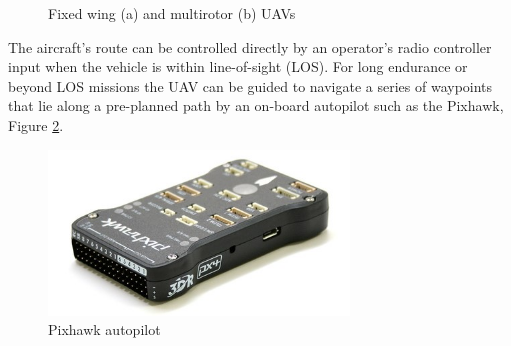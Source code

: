 \documentclass[numbered,pdftex]{ohio-etd}
\begin{document}
\begin{figure}[H]
	\begin{subfigmatrix}{2}%
		\centering	
		\hspace*{0mm}
	\end{subfigmatrix}
	\caption{Fixed wing (a) and multirotor (b) UAVs}
	\label{fig:fixedMultirotor}
\end{figure}

The aircraft's route can be controlled directly by an operator's radio controller input when the vehicle is within line-of-sight (LOS). For long endurance or beyond LOS missions the UAV can be guided to navigate a series of waypoints that lie along a pre-planned path by an on-board autopilot such as the Pixhawk, Figure \ref{fig:pixhawk}.


\begin{figure}
	\centering
	\includegraphics[width=8cm]{PaperFigures/pixhawk}
	\caption{Pixhawk autopilot}
	\label{fig:pixhawk}
\end{figure}
\end{document}
